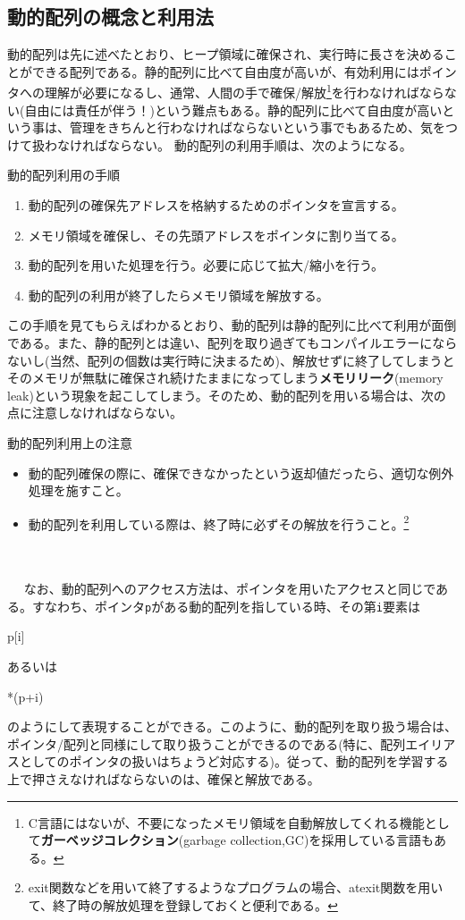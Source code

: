 \subsection{動的配列の概念と利用法}
動的配列は先に述べたとおり、ヒープ領域に確保され、実行時に長さを決めることができる配列である。静的配列に比べて自由度が高いが、有効利用にはポインタへの理解が必要になるし、通常、人間の手で確保/解放\footnote{C言語にはないが、不要になったメモリ領域を自動解放してくれる機能として\textbf{ガーベッジコレクション}(garbage collection,GC)を採用している言語もある。}を行わなければならない(自由には責任が伴う！)という難点もある。静的配列に比べて自由度が高いという事は、管理をきちんと行わなければならないという事でもあるため、気をつけて扱わなければならない。
動的配列の利用手順は、次のようになる。
\begin{itembox}[l]{動的配列利用の手順}
\begin{enumerate}
\item 動的配列の確保先アドレスを格納するためのポインタを宣言する。
\item メモリ領域を確保し、その先頭アドレスをポインタに割り当てる。
\item 動的配列を用いた処理を行う。必要に応じて拡大/縮小を行う。
\item 動的配列の利用が終了したらメモリ領域を解放する。
\end{enumerate}
\end{itembox}

この手順を見てもらえばわかるとおり、動的配列は静的配列に比べて利用が面倒である。また、静的配列とは違い、配列を取り過ぎてもコンパイルエラーにならないし(当然、配列の個数は実行時に決まるため)、解放せずに終了してしまうとそのメモリが無駄に確保され続けたままになってしまう\textbf{メモリリーク}(memory leak)という現象を起こしてしまう。そのため、動的配列を用いる場合は、次の点に注意しなければならない。
\begin{itembox}[l]{動的配列利用上の注意}
\begin{itemize}
\item 動的配列確保の際に、確保できなかったという返却値だったら、適切な例外処理を施すこと。
\item 動的配列を利用している際は、終了時に必ずその解放を行うこと。\footnote{exit関数などを用いて終了するようなプログラムの場合、atexit関数を用いて、終了時の解放処理を登録しておくと便利である。}
\end{itemize}
\end{itembox}
\\ \\　
なお、動的配列へのアクセス方法は、ポインタを用いたアクセスと同じである。すなわち、ポインタ\verb|p|がある動的配列を指している時、その第\verb|i|要素は
\begin{code}
p[i]
\end{code}
あるいは
\begin{code}
*(p+i)
\end{code}
のようにして表現することができる。このように、動的配列を取り扱う場合は、ポインタ/配列と同様にして取り扱うことができるのである(特に、配列エイリアスとしてのポインタの扱いはちょうど対応する)。従って、動的配列を学習する上で押さえなければならないのは、確保と解放である。

